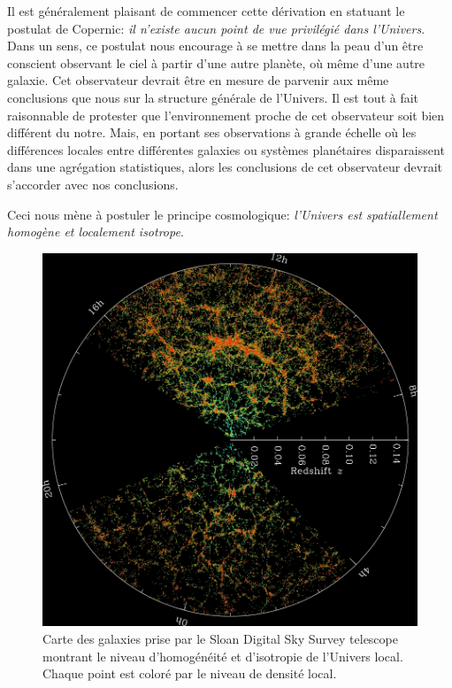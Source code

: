 Il est généralement plaisant de commencer cette dérivation en statuant le postulat de 
Copernic: \textit{il n'existe aucun point de vue privilégié dans l'Univers}. Dans un sens, 
ce postulat nous encourage à se mettre dans la peau d'un être conscient observant le ciel 
à partir d'une autre planète, où même d'une autre galaxie. Cet observateur devrait être en 
mesure de parvenir aux même conclusions que nous sur la structure générale de l'Univers. 
Il est tout à fait raisonnable de protester 
que l'environnement proche de cet observateur soit bien différent 
du notre. Mais, en portant ses observations à grande échelle où les différences locales 
entre différentes galaxies ou systèmes planétaires disparaissent dans une agrégation statistiques, 
alors les conclusions de cet observateur devrait s'accorder avec nos conclusions.

Ceci nous mène à postuler le principe cosmologique: 
\textit{l'Univers est spatiallement homogène et localement isotrope}.

\begin{figure}[H]
        \centering
        \includegraphics[width=\textwidth]{figures/sdss_universe}
        \caption{Carte des galaxies prise par le Sloan Digital Sky Survey telescope montrant 
        le niveau d'homogénéité et d'isotropie de l'Univers local. Chaque point est 
        coloré par le niveau de densité local.}
        \label{fig:sdss}
\end{figure}


